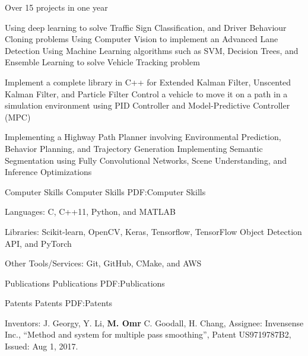 \documentclass[letterpaper,MMMyyyy,nonstopmode]{simpleresumecv}
\begin{document}
\begin{Body}
\Gap
{Over 15 projects in one year}

\BulletItem
Using deep learning to solve Traffic Sign Classification, and Driver Behaviour Cloning problems
\BulletItem
Using Computer Vision to implement an Advanced Lane Detection
\BulletItem
Using Machine Learning algorithms such as SVM, Decision Trees, and Ensemble Learning to solve Vehicle Tracking problem

\BulletItem
Implement a complete library in C++ for Extended Kalman Filter, Unscented Kalman Filter, and Particle Filter
\BulletItem
Control a vehicle to move it on a path in a simulation environment using PID Controller and Model-Predictive Controller (MPC)

\BulletItem
Implementing a Highway Path Planner involving Environmental Prediction, Behavior Planning, and Trajectory Generation
\BulletItem
Implementing Semantic Segmentation using Fully Convolutional Networks, Scene Understanding, and Inference Optimizations



\Section
{Computer \newline
Skills}
{Computer Skills}
{PDF:Computer Skills}

\Entry
Languages: C, C++11, Python, and MATLAB

\Entry
Libraries: Scikit-learn, OpenCV, Keras, Tensorflow, TensorFlow Object Detection API, and PyTorch

\Entry
Other Tools/Services: Git, GitHub, CMake, and AWS

\pagebreak


\Section
{Publications}
{Publications}
{PDF:Publications}

\SubSection
{Patents}
{Patents}
{PDF:Patents}

\begingroup
\renewcommand{\MaxNumberedItem}{[8]}

\Gap
\NumberedItem{[1]}
Inventors: J. Georgy, Y. Li, \textbf{M. Omr} C. Goodall, H. Chang, Assignee: Invensense Inc., “Method and system for multiple pass smoothing”, Patent US9719787B2, Issued: Aug 1, 2017.


\end{Body}
\end{document}
